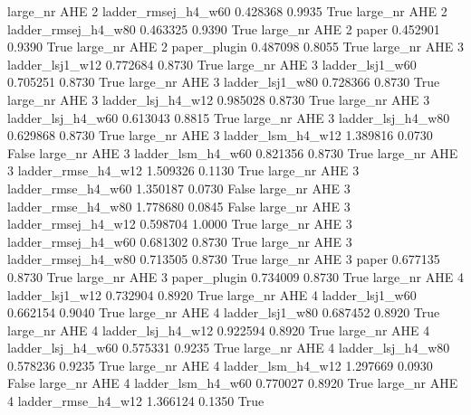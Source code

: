   large_nr      AHE                 2 ladder_rmsej_h4_w60    0.428368      0.9935    True
  large_nr      AHE                 2 ladder_rmsej_h4_w80    0.463325      0.9390    True
  large_nr      AHE                 2               paper    0.452901      0.9390    True
  large_nr      AHE                 2        paper_plugin    0.487098      0.8055    True
  large_nr      AHE                 3     ladder_lsj1_w12    0.772684      0.8730    True
  large_nr      AHE                 3     ladder_lsj1_w60    0.705251      0.8730    True
  large_nr      AHE                 3     ladder_lsj1_w80    0.728366      0.8730    True
  large_nr      AHE                 3   ladder_lsj_h4_w12    0.985028      0.8730    True
  large_nr      AHE                 3   ladder_lsj_h4_w60    0.613043      0.8815    True
  large_nr      AHE                 3   ladder_lsj_h4_w80    0.629868      0.8730    True
  large_nr      AHE                 3   ladder_lsm_h4_w12    1.389816      0.0730   False
  large_nr      AHE                 3   ladder_lsm_h4_w60    0.821356      0.8730    True
  large_nr      AHE                 3  ladder_rmse_h4_w12    1.509326      0.1130    True
  large_nr      AHE                 3  ladder_rmse_h4_w60    1.350187      0.0730   False
  large_nr      AHE                 3  ladder_rmse_h4_w80    1.778680      0.0845   False
  large_nr      AHE                 3 ladder_rmsej_h4_w12    0.598704      1.0000    True
  large_nr      AHE                 3 ladder_rmsej_h4_w60    0.681302      0.8730    True
  large_nr      AHE                 3 ladder_rmsej_h4_w80    0.713505      0.8730    True
  large_nr      AHE                 3               paper    0.677135      0.8730    True
  large_nr      AHE                 3        paper_plugin    0.734009      0.8730    True
  large_nr      AHE                 4     ladder_lsj1_w12    0.732904      0.8920    True
  large_nr      AHE                 4     ladder_lsj1_w60    0.662154      0.9040    True
  large_nr      AHE                 4     ladder_lsj1_w80    0.687452      0.8920    True
  large_nr      AHE                 4   ladder_lsj_h4_w12    0.922594      0.8920    True
  large_nr      AHE                 4   ladder_lsj_h4_w60    0.575331      0.9235    True
  large_nr      AHE                 4   ladder_lsj_h4_w80    0.578236      0.9235    True
  large_nr      AHE                 4   ladder_lsm_h4_w12    1.297669      0.0930   False
  large_nr      AHE                 4   ladder_lsm_h4_w60    0.770027      0.8920    True
  large_nr      AHE                 4  ladder_rmse_h4_w12    1.366124      0.1350    True
